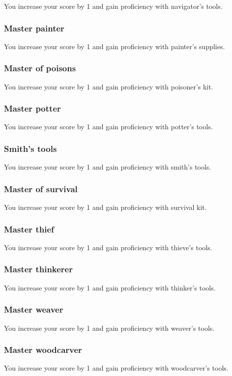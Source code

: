You increase your \intelligence{} score by 1 and gain proficiency with navigator's tools.

\subsubsection{Master painter}

You increase your \wisdom{} score by 1 and gain proficiency with painter's supplies.

\subsubsection{Master of poisons}

You increase your \intelligence{} score by 1 and gain proficiency with poisoner's kit.

\subsubsection{Master potter}

You increase your \dexterity{} score by 1 and gain proficiency with potter's tools.

\subsubsection{Smith's tools}

You increase your \strength{} score by 1 and gain proficiency with smith's tools.

\subsubsection{Master of survival}

You increase your \wisdom{} score by 1 and gain proficiency with survival kit.

\subsubsection{Master thief}

You increase your \dexterity{} score by 1 and gain proficiency with thieve's tools.

\subsubsection{Master thinkerer}

You increase your \intelligence{} score by 1 and gain proficiency with thinker's tools.

\subsubsection{Master weaver}

You increase your \dexterity{} score by 1 and gain proficiency with weaver's tools.

\subsubsection{Master woodcarver}

You increase your \dexterity{} score by 1 and gain proficiency with woodcarver's tools.
